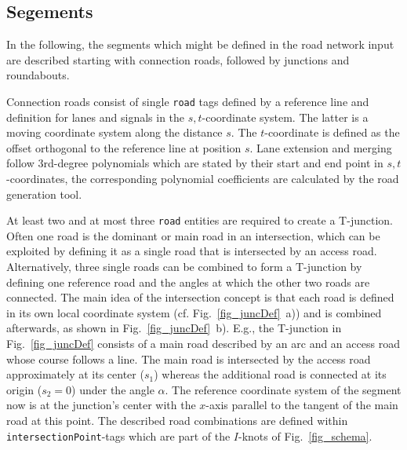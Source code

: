 \documentclass[a4paper, 10pt, conference]{ieeeconf}      %
\begin{document}
\subsection{Segements}\label{sec_segments}
In the following, the segments which might be defined in the road network input are described starting with connection roads, followed by junctions and roundabouts.

Connection roads consist of single \texttt{road} tags defined by a reference line and definition for lanes and signals in the $s,t$-coordinate system. The latter is a moving coordinate system along the distance $s$. The $t$-coordinate is defined as the offset orthogonal to the reference line at position $s$. Lane extension and merging follow 3rd-degree polynomials which are stated by their start and end point in $s,t$-coordinates, the corresponding polynomial coefficients are calculated by the road generation tool.

At least two and at most three \texttt{road} entities are required to create a T-junction. Often one road is the dominant or main road in an intersection, which can be exploited by defining it as a single road that is intersected by an access road. Alternatively, three single roads can be combined to form a T-junction by defining one reference road and the angles at which the other two roads are connected. The main idea of the intersection concept is that each road is defined in its own local coordinate system (cf. Fig.~\ref{fig_juncDef}~a)) and is combined afterwards, as shown in Fig.~\ref{fig_juncDef}~b). E.g., the T-junction in Fig.~\ref{fig_juncDef} consists of a main road described by an arc and an access road whose course follows a line. The main road is intersected by the access road approximately at its center ($s_1$) whereas the additional road is connected at its origin ($s_2=0$) under the angle $\alpha$. The reference coordinate system of the segment now is at the junction's center with the $x$-axis parallel to the tangent of the main road at this point. The described road combinations are defined within \texttt{intersectionPoint}-tags which are part of the $I$-knots of Fig.~\ref{fig_schema}.
\end{document}
